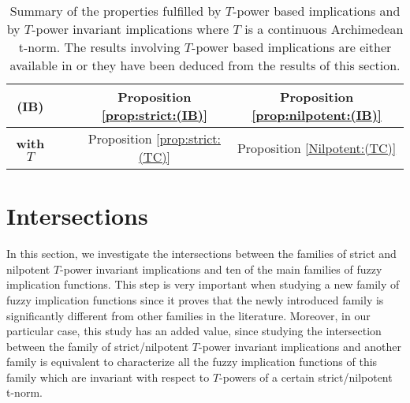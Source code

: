 \begin{table}[!t]
\begin{adjustbox}{max width=\textwidth}
\begin{tabular}{c|cc|cc|}
		\multicolumn{1}{|c|}{\bf (IB)}             &\multicolumn{1}{c|}{\xmark}            & \multicolumn{1}{c|}{\xmark}               & \multicolumn{1}{c|}{Proposition \ref{prop:strict:(IB)}}             &          \multicolumn{1}{c|}{Proposition \ref{prop:nilpotent:(IB)}}         \\ \hline
		\multicolumn{1}{|c|}{\bf \TC with $T$}      & \multicolumn{1}{c|}{\xmark}           &  \multicolumn{1}{c|}{\cite[Theorem 3.2]{Peng2022}}             & \multicolumn{1}{c|}{Proposition \ref{prop:strict:(TC)}}             &       \multicolumn{1}{c|}{Proposition \ref{Nilpotent:(TC)}}            \\ \hline
	\end{tabular}
	\end{adjustbox}
\caption[Summary of the properties fulfilled by $T$-power based implications and by $T$-power invariant implications where $T$ is a continuous Archimedean t-norm.]{Summary of the properties fulfilled by $T$-power based implications and by $T$-power invariant implications where $T$ is a continuous Archimedean t-norm. The results involving $T$-power based implications are either available in \cite{Massanet2017} or they have been deduced from the results of this section.}\label{table:summaryTpowerinvadditionalprop}
\end{table}
\section{Intersections}\label{section:intersectionsTpower}

In this section, we investigate the intersections between the families of strict and nilpotent $T$-power invariant implications and ten of the main families of fuzzy implication functions. This step is very important when studying a new family of fuzzy implication functions since it proves that the newly introduced family is significantly different from other  families in the literature. Moreover, in our particular case, this study has an added value, since studying the intersection between the family of strict/nilpotent $T$-power invariant implications and another family is equivalent to characterize all the fuzzy implication functions of this family which are invariant with respect to $T$-powers of a certain strict/nilpotent t-norm.

